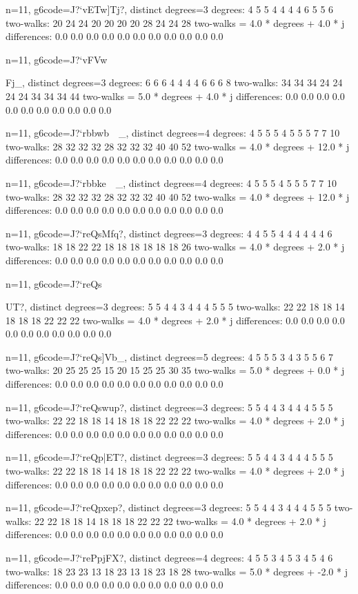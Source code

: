 {{{{{{{{{{{{{{{{{{{n=11, g6code=J?`vETw]Tj?, distinct degrees=3
degrees: 4 5 5 4 4 4 4 6 5 5 6 
two-walks: 20 24 24 20 20 20 20 28 24 24 28 
two-walks = 4.0 * degrees + 4.0 * j
differences: 0.0 0.0 0.0 0.0 0.0 0.0 0.0 0.0 0.0 0.0 0.0 

n=11, g6code=J?`vFVw}Fj_, distinct degrees=3
degrees: 6 6 6 4 4 4 4 6 6 6 8 
two-walks: 34 34 34 24 24 24 24 34 34 34 44 
two-walks = 5.0 * degrees + 4.0 * j
differences: 0.0 0.0 0.0 0.0 0.0 0.0 0.0 0.0 0.0 0.0 0.0 

n=11, g6code=J?`rbbwb~~_, distinct degrees=4
degrees: 4 5 5 5 4 5 5 5 7 7 10 
two-walks: 28 32 32 32 28 32 32 32 40 40 52 
two-walks = 4.0 * degrees + 12.0 * j
differences: 0.0 0.0 0.0 0.0 0.0 0.0 0.0 0.0 0.0 0.0 0.0 

n=11, g6code=J?`rbbke~~_, distinct degrees=4
degrees: 4 5 5 5 4 5 5 5 7 7 10 
two-walks: 28 32 32 32 28 32 32 32 40 40 52 
two-walks = 4.0 * degrees + 12.0 * j
differences: 0.0 0.0 0.0 0.0 0.0 0.0 0.0 0.0 0.0 0.0 0.0 

n=11, g6code=J?`reQsMfq?, distinct degrees=3
degrees: 4 4 5 5 4 4 4 4 4 4 6 
two-walks: 18 18 22 22 18 18 18 18 18 18 26 
two-walks = 4.0 * degrees + 2.0 * j
differences: 0.0 0.0 0.0 0.0 0.0 0.0 0.0 0.0 0.0 0.0 0.0 

n=11, g6code=J?`reQs{UT?, distinct degrees=3
degrees: 5 5 4 4 3 4 4 4 5 5 5 
two-walks: 22 22 18 18 14 18 18 18 22 22 22 
two-walks = 4.0 * degrees + 2.0 * j
differences: 0.0 0.0 0.0 0.0 0.0 0.0 0.0 0.0 0.0 0.0 0.0 

n=11, g6code=J?`reQs]Vb_, distinct degrees=5
degrees: 4 5 5 5 3 4 3 5 5 6 7 
two-walks: 20 25 25 25 15 20 15 25 25 30 35 
two-walks = 5.0 * degrees + 0.0 * j
differences: 0.0 0.0 0.0 0.0 0.0 0.0 0.0 0.0 0.0 0.0 0.0 

n=11, g6code=J?`reQswup?, distinct degrees=3
degrees: 5 5 4 4 3 4 4 4 5 5 5 
two-walks: 22 22 18 18 14 18 18 18 22 22 22 
two-walks = 4.0 * degrees + 2.0 * j
differences: 0.0 0.0 0.0 0.0 0.0 0.0 0.0 0.0 0.0 0.0 0.0 

n=11, g6code=J?`reQp|ET?, distinct degrees=3
degrees: 5 5 4 4 3 4 4 4 5 5 5 
two-walks: 22 22 18 18 14 18 18 18 22 22 22 
two-walks = 4.0 * degrees + 2.0 * j
differences: 0.0 0.0 0.0 0.0 0.0 0.0 0.0 0.0 0.0 0.0 0.0 

n=11, g6code=J?`reQpxep?, distinct degrees=3
degrees: 5 5 4 4 3 4 4 4 5 5 5 
two-walks: 22 22 18 18 14 18 18 18 22 22 22 
two-walks = 4.0 * degrees + 2.0 * j
differences: 0.0 0.0 0.0 0.0 0.0 0.0 0.0 0.0 0.0 0.0 0.0 

n=11, g6code=J?`rePpjFX?, distinct degrees=4
degrees: 4 5 5 3 4 5 3 4 5 4 6 
two-walks: 18 23 23 13 18 23 13 18 23 18 28 
two-walks = 5.0 * degrees + -2.0 * j
differences: 0.0 0.0 0.0 0.0 0.0 0.0 0.0 0.0 0.0 0.0 0.0 

}}}}}}}}}}}}}}}}}}}
